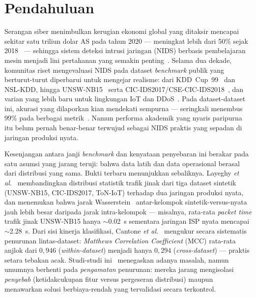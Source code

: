 \documentclass[11pt,a4paper]{article}
\begin{document}
\section{Pendahuluan}
\label{sec:intro}

Serangan siber menimbulkan kerugian ekonomi global yang ditaksir mencapai
sekitar satu triliun dolar AS pada tahun 2020 --- meningkat lebih dari 50\% sejak
2018~\cite{cremer} --- sehingga sistem deteksi intrusi jaringan (NIDS) berbasis
pembelajaran mesin menjadi lini pertahanan yang semakin penting~\cite{torres,sarker,khraisat,buczak,bhuyan}.
Selama dua
dekade, komunitas riset mengevaluasi NIDS pada dataset \emph{benchmark} publik
yang berturut-turut diperbarui untuk mengejar realisme: dari KDD~Cup~99~\cite{kdd}
dan NSL-KDD, hingga UNSW-NB15~\cite{unsw,unsweval} serta
CIC-IDS2017/CSE-CIC-IDS2018~\cite{cicids}, dan varian yang lebih baru untuk
lingkungan IoT dan DDoS~\cite{botiot,toniot,ciciot,cicddos,ring}. Pada
dataset-dataset ini, akurasi yang
dilaporkan kian mendekati sempurna --- seringkali menembus 99\% pada berbagai
metrik~\cite{layeghy}. Namun performa akademik yang nyaris paripurna itu belum
pernah benar-benar terwujud sebagai NIDS praktis yang sepadan di jaringan
produksi nyata.

Kesenjangan antara janji \emph{benchmark} dan kenyataan penyebaran ini berakar
pada satu asumsi yang jarang teruji: bahwa data latih dan data operasional
berasal dari distribusi yang sama. Bukti terbaru menunjukkan sebaliknya. Layeghy
\emph{et al.}~\cite{layeghy} membandingkan distribusi statistik trafik jinak dari
tiga dataset sintetik (UNSW-NB15, CIC-IDS2017, ToN-IoT) terhadap dua jaringan
produksi nyata, dan menemukan bahwa jarak Wasserstein~\cite{wasserstein}
antar-kelompok
sintetik-versus-nyata jauh lebih besar daripada jarak intra-kelompok ---
misalnya, rata-rata \emph{packet time} trafik jinak UNSW-NB15 hanya
$\sim$\SI{0.02}{\second} sementara jaringan ISP nyata mencapai
$\sim$\SI{2.28}{\second}. Dari sisi kinerja klasifikasi, Cantone
\emph{et al.}~\cite{cantone} mengukur secara sistematis penurunan lintas-dataset:
\emph{Matthews Correlation Coefficient} (MCC) rata-rata anjlok dari $0{,}946$
(\emph{within-dataset}) menjadi hanya $0{,}294$ (\emph{cross-dataset}) --- praktis
setara tebakan acak. Studi-studi ini~\cite{cantone,layeghy,dhooge,verkerken}
menegaskan adanya masalah, namun umumnya berhenti pada \emph{pengamatan}
penurunan: mereka jarang mengisolasi \emph{penyebab} (ketidakcukupan fitur versus
pergeseran distribusi) maupun menawarkan solusi berbiaya-rendah yang tervalidasi
secara terkontrol.
\end{document}
